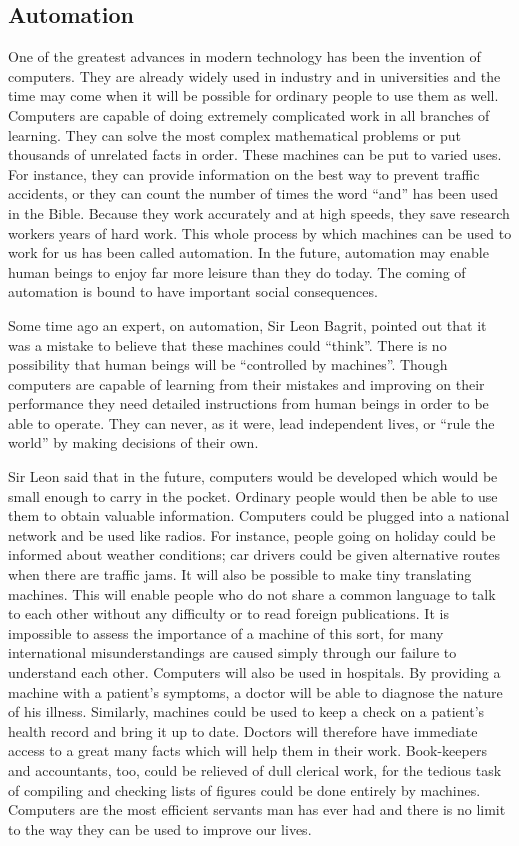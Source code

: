 \documentclass[11pt]{article}
\begin{document}
\subsection{Automation}
\label{sec-1-51}

One of the greatest advances in modern technology has been the invention of computers. They are already widely used in industry and in universities and the time may come when it will be possible for ordinary people to use them as well. Computers are capable of doing extremely complicated work in all branches of learning. They can solve the most complex mathematical problems or put thousands of unrelated facts in order. These machines can be put to varied uses. For instance, they can provide information on the best way to prevent traffic accidents, or they can count the number of times the word ``and'' has been used in the Bible. Because they work accurately and at high speeds, they save research workers years of hard work. This whole process by which machines can be used to work for us has been called automation. In the future, automation may enable human beings to enjoy far more leisure than they do today. The coming of automation is bound to have important social consequences. 

Some time ago an expert, on automation, Sir Leon Bagrit, pointed out that it was a mistake to believe that these machines could ``think''. There is no possibility that human beings will be ``controlled by machines''. Though computers are capable of learning from their mistakes and improving on their performance they need detailed instructions from human beings in order to be able to operate. They can never, as it were, lead independent lives, or ``rule the world'' by making decisions of their own.

Sir Leon said that in the future, computers would be developed which would be small enough to carry in the pocket. Ordinary people would then be able to use them to obtain valuable information. Computers could be plugged into a national network and be used like radios. For instance, people going on holiday could be informed about weather conditions; car drivers could be given alternative routes when there are traffic jams. It will also be possible to make tiny translating machines. This will enable people who do not share a common language to talk to each other without any difficulty or to read foreign publications. It is impossible to assess the importance of a machine of this sort, for many international misunderstandings are caused simply through our failure to understand each other. Computers will also be used in hospitals. By providing a machine with a patient's symptoms, a doctor will be able to diagnose the nature of his illness. Similarly, machines could be used to keep a check on a patient's health record and bring it up to date. Doctors will therefore have immediate access to a great many facts which will help them in their work. Book-keepers and accountants, too, could be relieved of dull clerical work, for the tedious task of compiling and checking lists of figures could be done entirely by machines. Computers are the most efficient servants man has ever had and there is no limit to the way they can be used to improve our lives. 
\end{document}
